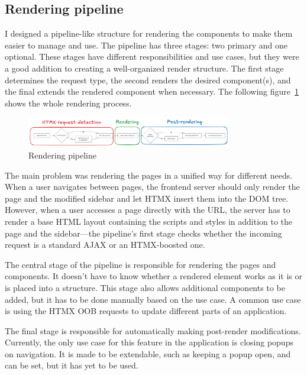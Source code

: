 \subsection{Rendering pipeline}

I designed a pipeline-like structure for rendering the components to make them easier to manage and use. The pipeline has three stages: two primary and one optional. These stages have different responsibilities and use cases, but they were a good addition to creating a well-organized render structure. The first stage determines the request type, the second renders the desired component(s), and the final extends the rendered component when necessary. The following figure~\ref{fig:rendering-pipeline} shows the whole rendering process.

\begin{figure}[H]
    \centering
    \includegraphics[width=0.8\textwidth, keepaspectratio]{figures/rendering-pipeline.png}
    \caption{Rendering pipeline}
    \label{fig:rendering-pipeline}
\end{figure}

The main problem was rendering the pages in a unified way for different needs. When a user navigates between pages, the frontend server should only render the page and the modified sidebar and let HTMX insert them into the DOM tree. However, when a user accesses a page directly with the URL, the server has to render a base HTML layout containing the scripts and styles in addition to the page and the sidebar—the pipeline's first stage checks whether the incoming request is a standard AJAX or an HTMX-boosted one.

The central stage of the pipeline is responsible for rendering the pages and components. It doesn't have to know whether a rendered element works as it is or is placed into a structure. This stage also allows additional components to be added, but it has to be done manually based on the use case. A common use case is using the HTMX OOB requests to update different parts of an application.

The final stage is responsible for automatically making post-render modifications. Currently, the only use case for this feature in the application is closing popups on navigation. It is made to be extendable, such as keeping a popup open, and can be set, but it has yet to be used.

